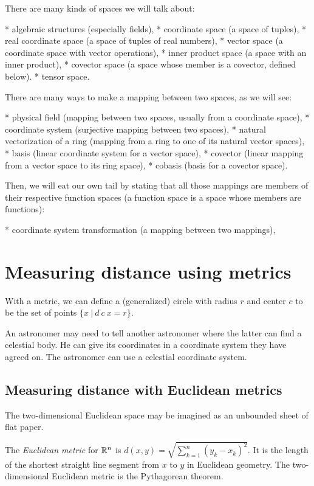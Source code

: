 There are many kinds of spaces we will talk about:

* algebraic structures (especially fields),
* coordinate space (a space of tuples),
* real coordinate space (a space of tuples of real numbers),
* vector space (a coordinate space with vector operations),
* inner product space (a space with an inner product),
* covector space (a space whose member is a covector, defined below).
* tensor space.

There are many ways to make a mapping between two spaces,
as we will see:

* physical field (mapping between two spaces, usually from a coordinate space),
* coordinate system (surjective mapping between two spaces),
* natural vectorization of a ring (mapping from a ring to one of its natural vector spaces),
* basis (linear coordinate system for a vector space),
* covector (linear mapping from a vector space to its ring space),
* cobasis (basis for a covector space).

Then, we will eat our own tail by stating that all those mappings are members of their respective function spaces
(a function space is a space whose members are functions):

* coordinate system transformation (a mapping between two mappings),

\section{Measuring distance using metrics}

With a metric, we can define
a (generalized) circle with radius $r$ and center $c$
to be the set of points
$\{x ~|~ d~c~x = r \}$.

An astronomer may need to tell another astronomer where the latter can find a celestial body.
He can give its coordinates in a coordinate system they have agreed on.
The astronomer can use a celestial coordinate system.

\subsection{Measuring distance with Euclidean metrics}

%
The two-dimensional Euclidean space
may be imagined as an unbounded sheet of flat paper.

The \emph{Euclidean metric} for \(\mathbb{R}^n\) is \( d(x,y) = \sqrt{\sum_{k=1}^n (y_k-x_k)^2} \).
It is the length of the shortest straight line segment from \(x\) to \(y\) in Euclidean geometry.
The two-dimensional Euclidean metric is the Pythagorean theorem.

